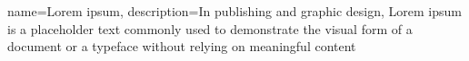 {
  name={Lorem ipsum},
  description={In publishing and graphic design, Lorem ipsum is a placeholder text commonly used to demonstrate the visual form of a document or a typeface without relying on meaningful content}
}
